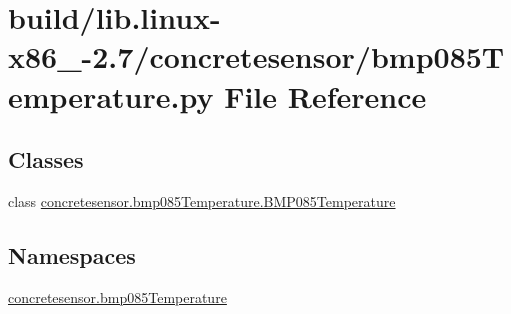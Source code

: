 \hypertarget{build_2lib_8linux-x86__64-2_87_2concretesensor_2bmp085Temperature_8py}{}\section{build/lib.linux-\/x86\+\_-\/2.7/concretesensor/bmp085\+Temperature.py File Reference}
\label{build_2lib_8linux-x86__64-2_87_2concretesensor_2bmp085Temperature_8py}
\subsection*{Classes}
\begin{DoxyCompactItemize}
\item 
class \hyperlink{classconcretesensor_1_1bmp085Temperature_1_1BMP085Temperature}{concretesensor.\+bmp085\+Temperature.\+B\+M\+P085\+Temperature}
\end{DoxyCompactItemize}
\subsection*{Namespaces}
\begin{DoxyCompactItemize}
\item 
 \hyperlink{namespaceconcretesensor_1_1bmp085Temperature}{concretesensor.\+bmp085\+Temperature}
\end{DoxyCompactItemize}
